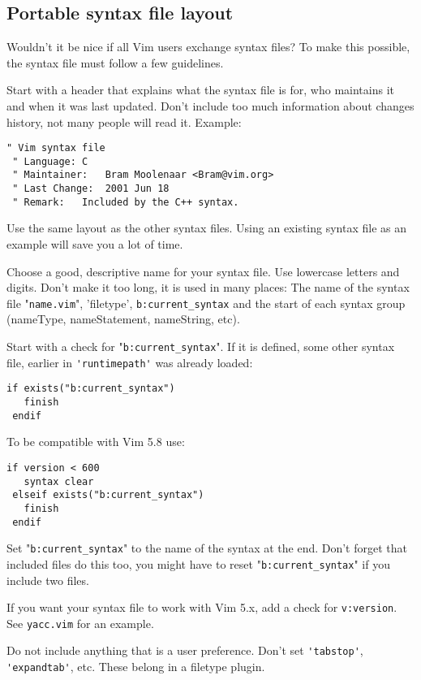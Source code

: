 \subsection{Portable syntax file layout}
Wouldn't it be nice if all Vim users exchange syntax files?  To make this possible, the syntax file must follow a few guidelines.

Start with a header that explains what the syntax file is for, who maintains it and when it was last updated.
Don't include too much information about changes history, not many people will read it.
Example:

\begin{Verbatim}[samepage=true]
 " Vim syntax file
 " Language: C
 " Maintainer:   Bram Moolenaar <Bram@vim.org>
 " Last Change:  2001 Jun 18
 " Remark:   Included by the C++ syntax.
\end{Verbatim}

Use the same layout as the other syntax files.
Using an existing syntax file as an example will save you a lot of time.

Choose a good, descriptive name for your syntax file.
Use lowercase letters and digits.
Don't make it too long, it is used in many places: The name of the syntax file "\verb!name.vim!", 'filetype', \verb!b:current_syntax! and the start of each syntax group (nameType, nameStatement, nameString, etc).

Start with a check for "\verb!b:current_syntax!".
If it is defined, some other syntax file, earlier in \verb!'runtimepath'! was already loaded:

\begin{Verbatim}[samepage=true]
 if exists("b:current_syntax")
   finish
 endif
\end{Verbatim}

To be compatible with Vim 5.8 use:

\begin{Verbatim}[samepage=true]
 if version < 600
   syntax clear
 elseif exists("b:current_syntax")
   finish
 endif
\end{Verbatim}

Set "\verb!b:current_syntax!" to the name of the syntax at the end.
Don't forget that included files do this too, you might have to reset "\verb!b:current_syntax!" if you include two files.

If you want your syntax file to work with Vim 5.x, add a check for \verb!v:version!.
See \verb!yacc.vim! for an example.

Do not include anything that is a user preference.
Don't set \verb!'tabstop'!, \verb!'expandtab'!, etc.
These belong in a filetype plugin.

